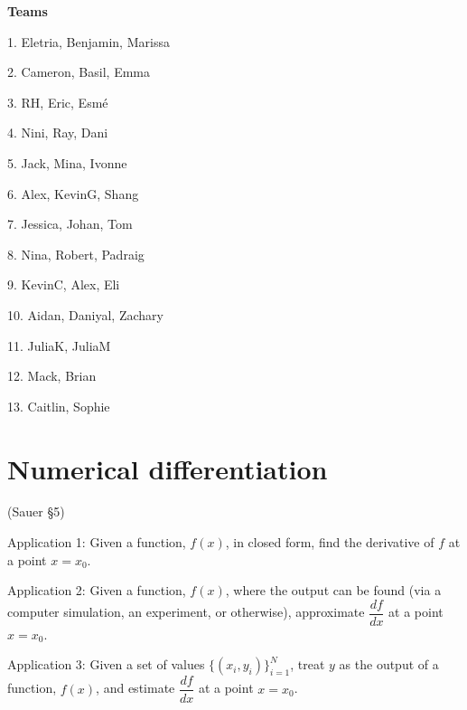 \documentclass[12pt,letterpaper,noanswers]{exam}
\begin{document}
\noindent \textbf{Teams}
\begin{multicols}{3}
1. Eletria, Benjamin, Marissa

2. Cameron, Basil, Emma

3. RH, Eric, Esmé

4. Nini, Ray, Dani

5. Jack, Mina, Ivonne

6. Alex, KevinG, Shang

7. Jessica, Johan, Tom

8. Nina, Robert, Padraig

9. KevinC, Alex, Eli

10.  Aidan, Daniyal, Zachary

11. JuliaK, JuliaM

12. Mack, Brian

13. Caitlin, Sophie

\end{multicols}

\section*{Numerical differentiation}

(Sauer \S 5)

\noindent Application 1: Given a function, $f(x)$, in closed form, find the derivative of $f$ at a point $x = x_0$. 

\noindent Application 2: Given a function, $f(x)$, where the output can be found (via a computer simulation, an experiment, or otherwise), approximate $\dfrac{df}{dx}$ at a point $x = x_0$.

\noindent Application 3: Given a set of values $\{(x_i,y_i)\}_{i=1}^N$, treat $y$ as the output of a function, $f(x)$, and estimate $\dfrac{df}{dx}$ at a point $x = x_0$.

\eject
\end{document}
